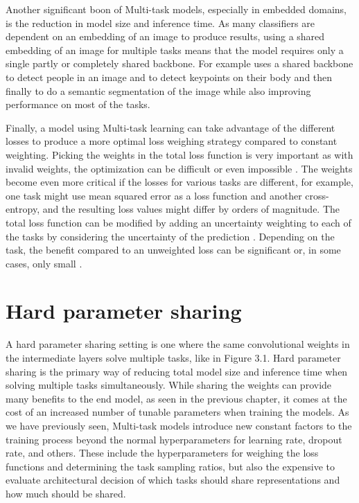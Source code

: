 Another significant boon of Multi-task models, especially in embedded domains, is the reduction in model size and inference time.
As many classifiers are dependent on an embedding of an image to produce results, using a shared embedding of an image for multiple tasks means that the model requires only a single partly or completely shared backbone.
For example \citep{multiPoseNet} uses a shared backbone to detect people in an image and to detect keypoints on their body and then finally to do a semantic segmentation of the image while also improving performance on most of the tasks.

Finally, a model using Multi-task learning can take advantage of the different losses to produce a more optimal loss weighing strategy compared to constant weighting.
Picking the weights in the total loss function is very important as with invalid weights, the optimization can be difficult or even impossible \citep{lossWeighting}.
The weights become even more critical if the losses for various tasks are different, for example, one task might use mean squared error as a loss function and another cross-entropy, and the resulting loss values might differ by orders of magnitude.
The total loss function can be modified by adding an uncertainty weighting to each of the tasks by considering the uncertainty of the prediction \citep{usingUncertaintyToWeighLosses}.
Depending on the task, the benefit compared to an unweighted loss can be significant \citep{usingUncertaintyToWeighLosses} or, in some cases, only small \citep{lossWeighting}.

\section{Hard parameter sharing}
A hard parameter sharing setting is one where the same convolutional weights in the intermediate layers solve multiple tasks, like in Figure 3.1.
Hard parameter sharing is the primary way of reducing total model size and inference time when solving multiple tasks simultaneously.
While sharing the weights can provide many benefits to the end model, as seen in the previous chapter, it comes at the cost of an increased number of tunable parameters when training the models.
As we have previously seen, Multi-task models introduce new constant factors to the training process beyond the normal hyperparameters for learning rate, dropout rate, and others.
These include the hyperparameters for weighing the loss functions and determining the task sampling ratios, but also the expensive to evaluate architectural decision of which tasks should share representations and how much should be shared.

